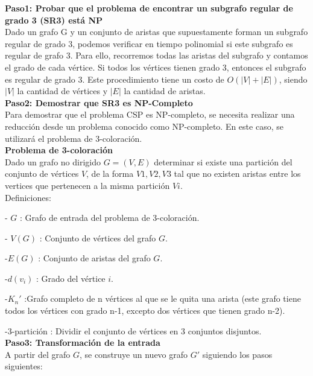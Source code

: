 \documentclass[
10pt, %
a4paper, %
oneside, %
headinclude,footinclude, %
BCOR5mm, %
]{scrartcl}
\begin{document}
\textbf{Paso1: Probar que el problema de encontrar un subgrafo regular de grado 3 (SR3) está NP }\\


Dado un grafo G y un conjunto de aristas que supuestamente forman un subgrafo regular de grado 3, podemos verificar en 
tiempo polinomial si este subgrafo es regular de grafo 3. Para ello, recorremos todas las aristas del subgrafo y contamos el grado de
cada vértice. Si todos los vértices tienen grado 3, entonces el subgrafo es regular de grado 3. Este procedimiento tiene un costo de 
$O(|V|+|E|)$, siendo $|V|$ la cantidad de vértices y $|E|$ la cantidad de aristas.\\


\textbf{Paso2: Demostrar que SR3 es NP-Completo}\\

Para demostrar que el problema CSP es NP-completo, se necesita realizar una reducción desde un problema conocido como NP-completo. 
En este caso, se utilizará el problema de 3-coloración.\\


\textbf{ Problema de 3-coloración} \\


Dado un grafo no dirigido $G = (V,E)$ determinar si existe una partición del conjunto de vértices $V$,
de la forma ${V1,V2,V3}$ tal que no existen aristas entre los vertices que pertenecen a la misma partición $Vi$.\\


Definiciones:

- $G$ : Grafo de entrada del problema de 3-coloración.

- $V(G)$ : Conjunto de vértices del grafo $G$.

-$E(G)$ : Conjunto de aristas del grafo $G$. 

-$d(v_i)$ : Grado del vértice $i$.

-$K_n'$ :Grafo completo de n vértices al que se le quita una arista (este grafo tiene todos los vértices con grado n-1, excepto dos vértices que tienen grado n-2).

-3-partición : Dividir el conjunto de vértices en 3 conjuntos disjuntos.\\



\textbf{Paso3: Transformación de la entrada  }\\

A partir del grafo $G$, se construye un nuevo grafo $G'$ siguiendo los pasos siguientes:\\
\end{document}
